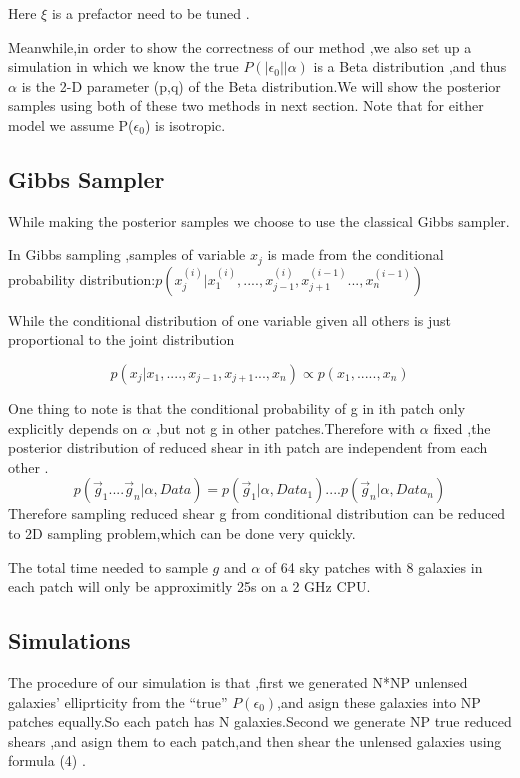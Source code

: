 \documentclass[useAMS,usenatbib]{mn2e}
\begin{document}
Here $\xi$ is a prefactor need to be tuned .

Meanwhile,in order to show the correctness of our method ,we also
set up a simulation in which we know the true $P(|\epsilon_{0}||\alpha)$
is a Beta distribution ,and thus $\alpha$ is the 2-D parameter (p,q)
of the Beta distribution.We will show the posterior samples using
both of these two methods in next section. Note that for either model
we assume P($\epsilon_{0}$) is isotropic.


\subsection{Gibbs Sampler}

While making the posterior samples we choose to use the classical
Gibbs sampler.

In Gibbs sampling ,samples of variable $x_{j}$ is made from the conditional
probability distribution:$p(x_{j}^{(i)}|x_{1}^{(i)},....,x_{j-1}^{(i)},x_{j+1}^{(i-1)}...,x_{n}^{(i-1)})$

While the conditional distribution of one variable given all others
is just proportional to the joint distribution

\begin{equation}
p(x_{j}|x_{1},....,x_{j-1},x_{j+1}...,x_{n})\varpropto p(x_{1},.....,x_{n})
\end{equation}


One thing to note is that the conditional probability of g in ith
patch only explicitly depends on $\alpha$ ,but not g in other patches.Therefore
with $\alpha$ fixed ,the posterior distribution of reduced shear
in ith patch are independent from each other .
\begin{equation}
p(\vec{g}_{1}....\vec{g}_{n}|\alpha,Data)=p(\vec{g}_{1}|\alpha,Data_{1})....p(\vec{g}_{n}|\alpha,Data_{n})
\end{equation}
Therefore sampling reduced shear g from conditional distribution can
be reduced to 2D sampling problem,which can be done very quickly.

The total time needed to sample $g$ and $\alpha$ of 64 sky patches
with 8 galaxies in each patch will only be approximitly 25s on a 2
GHz CPU.


\subsection{Simulations}

The procedure of our simulation is that ,first we generated N{*}NP
unlensed galaxies' elliprticity from the ``true'' $P(\epsilon_{0})$,and
asign these galaxies into NP patches equally.So each patch has N galaxies.Second
we generate NP true reduced shears ,and asign them to each patch,and
then shear the unlensed galaxies using formula (4) .
\end{document}
